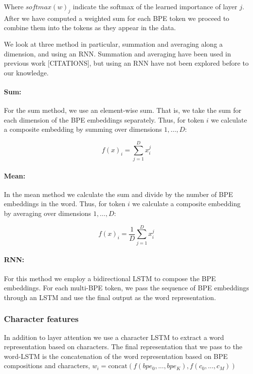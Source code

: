 \documentclass[11pt]{article}
\begin{document}
        Where $softmax(w)_j$ indicate the softmax of the learned
     importance of layer $j$. After we have computed a weighted sum for
     each BPE token we proceed to combine them into the tokens as they
     appear in the data.
    
            We look at three method in particular, summation and
     averaging along a dimension, and using an RNN. Summation and
     averaging have been used in previous work [CITATIONS], but using
     an RNN have not been explored before to our knowledge.
    
    	\paragraph{Sum:} For the sum method, we use an element-wise
     sum. That is, we take the sum for each dimension of the BPE
     embeddings separately. Thus, for token $i$ we calculate a
     composite embedding by summing over dimensions $1,\ldots,D$:
	
	\begin{equation}
	f(x)_i = \sum_{j=1}^{D} x_i^j
	\end{equation}
	

    	\paragraph{Mean:} In the mean method we calculate the sum and
     divide by the number of BPE embeddings in the word. Thus, for
     token $i$ we calculate a composite embedding by averaging over
     dimensions $1,\ldots,D$:
	
	\begin{equation}
	f(x)_{i} = \frac{1}{D}\sum_{j=1}^{D} x_i^j
	\end{equation}
	
	
	\paragraph{RNN:} For this method we employ a bidirectional LSTM
        to compose the BPE embeddings. For each multi-BPE
        token, we pass the sequence of BPE embeddings through an LSTM
        and use the final output as the word representation. 
    
	\subsubsection{Character features}
    	In addition to layer attention we use a character LSTM to
     extract a word representation based on characters. The final
     representation that we pass to the word-LSTM is the concatenation
     of the word representation based on BPE compositions and
     characters,
     $w_i = \text{concat}(f(bpe_0,...,bpe_K), f(c_0, ..., c_M))$
	
\end{document}
